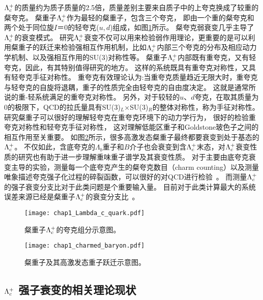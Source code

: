 $\Lambda_{c}^{+}$的质量约为质子质量的2.5倍，质量差别主要来自质子中的上夸克换成了较重的粲夸克。
粲重子$\Lambda_{c}^{+}$作为最轻的粲重子，包含三个夸克， 即由一个重的粲夸克和两个处于同位旋$I$＝0的轻夸克($u,d$)组成，如图\ref{fig:lambdac_quark}所示。
粲夸克弱衰变几乎主导了$\Lambda_{c}^{+}$的衰变模式。
研究$\Lambda_{c}^{+}$衰变不仅可以用来检验弱作用理论，更重要的是可以利用粲重子的跃迁来检验强相互作用机制，比如$\Lambda_{c}^{+}$内部三个夸克的分布及相应动力学机制、以及强相互作用的SU(3)对称性等。
粲重子$\Lambda_{c}^{+}$内部既有重夸克，又有轻夸克，因此，有其特别值得研究的地方。
这样的系统既具有重夸克对称性，又具有轻夸克手征对称性。
重夸克有效理论认为:当重夸克质量趋近无限大时，重夸克与轻夸克的自旋将退耦，重子的性质完全由轻夸克的自由度决定。
这就是通常所说的重-轻系统满足的重夸克对称性。
另外，对于较轻的$u$、$d$夸克，在取其质量为0的极限下，QCD的拉氏量具有SU(3)$_{L}$$\times$SU(3)$_{R}$的整体对称性，称为手征对称性。
研究粲重子可以很好的理解轻夸克在重夸克环境下的动力学行为， 很好的检验重夸克对称性和轻夸克手征对称性， 这对理解低能区重子和Goldstone玻色子之间的相互作用至关重要。
如图\ref{fig:charmed_baryon}所示，很多高激发态粲重子最终都要衰变到处于基态的$\Lambda_{c}^{+}$。
不仅如此，含底夸克的$\Lambda_b$重子和$B$介子也会衰变到含$\Lambda_{c}^{+}$末态，对$\Lambda_{c}^{+}$衰变性质的研究也有助于进一步理解重味重子谱学及其衰变性质。
对于主要由底夸克衰变主导的实验，测量每一个底夸克产生的粲夸克数目（charm counting）以及测量唯象描述夸克强子化过程的碎裂函数，可以很好的对QCD进行检验~\cite{Abreu:1999vw,Barate:1999bg}。
而测量$\Lambda_{c}^{+}$的强子衰变分支比对于此类问题是个重要输入量。
目前对于此类计算最大的系统误差来源已经是粲重子$\Lambda_{c}^{+}$的衰变分支比~\cite{Dytman:2002yd,Aaij:2011jp}。

\begin{figure}[!tbp]
\begin{center}
\texttt{[image: chap1\_Lambda\_c\_quark.pdf]}
\end{center}
\caption{粲重子$\Lambda_{c}^{+}$的夸克组分示意图。}
\label{fig:lambdac_quark}
\end{figure}

\begin{figure}[!tbp]
\begin{center}
\texttt{[image: chap1\_charmed\_baryon.pdf]}
\end{center}
\caption{粲重子及其高激发态重子跃迁示意图。}
\label{fig:charmed_baryon}
\end{figure}


\subsection{$\Lambda_{c}^{+}$ 强子衰变的相关理论现状}


